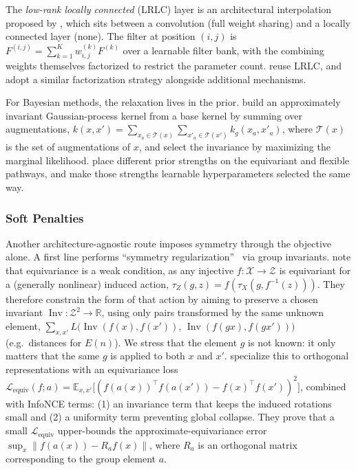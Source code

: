 \documentclass[mathematics,review,submit,moreauthors]{Definitions/mdpi}
\begin{document}
The \emph{low-rank locally connected} (LRLC) layer is an architectural interpolation proposed by \citet{elsayed2020p3icml}, which sits between a convolution (full weight sharing) and a locally connected layer (none).
The filter at position $(i,j)$ is $F^{(i,j)}=\sum_{k=1}^{K}w^{(k)}_{i,j}F^{(k)}$ over a learnable filter bank, with the combining weights themselves factorized to restrict the parameter count.
\citet{zhou2021} reuse LRLC, and \citet{ouderaa2023} adopt a similar factorization strategy alongside additional mechanisms. 

For Bayesian methods, the relaxation lives in the prior.
\citet{vanderwilk2018anips} build an approximately invariant Gaussian-process kernel from a base kernel by summing over augmentations, $k(x,x')=\sum_{x_a\in\mathcal{T}(x)}\sum_{x'_a\in\mathcal{T}(x')}k_g(x_a,x'_a)$, where $\mathcal{T}(x)$ is the set of augmentations of $x$, and select the invariance by maximizing the marginal likelihood.
\citet{finzi2021anips} place different prior strengths on the equivariant and flexible pathways, and \citet{ouderaa2023} make those strengths learnable hyperparameters selected the same way.

\subsubsection{Soft Penalties}\label{sec:approx-soft}
Another architecture-agnostic route imposes symmetry through the objective alone.
A first line performs ``symmetry regularization''~\citep{shakerinava2022anips} via group invariants.
\citet{shakerinava2022anips} note that equivariance is a weak condition, as any injective $f:\mathcal{X}\to \mathcal{Z}$ is equivariant for a (generally nonlinear) induced action, $\tau_Z(g,z)=f(\tau_X(g,f^{-1}(z)))$.
They therefore constrain the form of that action by aiming to preserve a chosen invariant $\operatorname{Inv}:\mathcal{Z}^2\to\mathbb{R}$, using only pairs transformed by the same unknown element, $\sum_{x, x'} L\big(\operatorname{Inv}(f(x),f(x')),\,\operatorname{Inv}(f(gx),f(gx'))\big)$ (e.g.\ distances for $E(n)$).
We stress that the element $g$ is not known: it only matters that the same $g$ is applied to both $x$ and $x'$.
\citet{gupta2023a} specialize this to orthogonal representations with an equivariance loss $\mathcal{L}_{\mathrm{equiv}}(f;a)=\mathbb{E}_{x,x'}\big[(f(a(x))^\top f(a(x'))-f(x)^\top f(x'))^2\big]$, combined with InfoNCE terms: (1) an invariance term that keeps the induced rotations small and (2) a uniformity term preventing global collapse.
They prove that a small $\mathcal{L}_{\mathrm{equiv}}$ upper-bounds the approximate-equivariance error $\sup_x\|f(a(x))-R_a f(x)\|$, where $R_a$ is an orthogonal matrix corresponding to the group element $a$.
\end{document}
